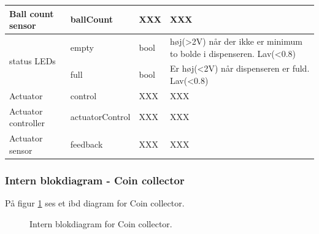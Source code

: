 \documentclass[Arkitektur/System_main.tex]{subfiles}
\begin{document}
\begin{table}[]
\begin{tabular}{|l|l|l|l|}
Ball count sensor                    & ballCount         & XXX       & XXX                                                                                       \\ \hline
\multirow{2}{*}{status LEDs}         & empty             & bool      & høj(\textgreater{}2V) når der ikke er minimum to bolde i dispenseren. Lav(\textless{}0.8) \\ \cline{2-4} 
                                     & full              & bool      & Er høj(\textless{}2V) når dispenseren er fuld. Lav(\textless{}0.8)                        \\ \hline
Actuator                             & control           & XXX       & XXX                                                                                       \\ \hline
Actuator controller                  & actuatorControl   & XXX       & XXX                                                                                       \\ \hline
Actuator sensor                      & feedback          & XXX       & XXX                                                                                       \\ \hline
\end{tabular}
\end{table}


\subsubsection{Intern blokdiagram - Coin collector} \label{sec:coin_collector_hardware_ibd}

På figur \ref{fig:coin_collector_hardware_ibd} ses et ibd diagram for Coin collector.

\begin{figure}[H]
    \centering
    \caption{Intern blokdiagram for Coin collector.}
    \label{fig:coin_collector_hardware_ibd}
\end{figure}
\end{document}

